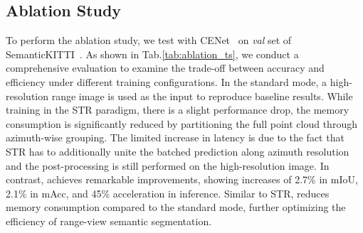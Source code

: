 \subsection{Ablation Study}
To perform the ablation study, we test with CENet~\cite{cheng2022cenet} on \textit{val} set of SemanticKITTI~\cite{behley2019semantickitti}. %
 As shown in Tab.\ref{tab:ablation_ts}, we conduct a comprehensive evaluation to examine the trade-off between accuracy and efficiency under different training configurations. In the standard mode, a high-resolution range image is used as the input to reproduce baseline results. While training in the STR paradigm\cite{kong2023rethinking}, there is a slight performance drop, the memory consumption is significantly reduced by partitioning the full point cloud through azimuth-wise grouping. The limited increase in latency is due to the fact that STR has to additionally unite the batched prediction along azimuth resolution and the post-processing is still performed on the high-resolution image. In contrast, \coolname{} achieves remarkable improvements, showing increases of 2.7\% in mIoU, 2.1\% in mAcc, and 45\% acceleration in inference. Similar to STR, \coolname{} reduces memory consumption compared to the standard mode, further optimizing the efficiency of range-view semantic segmentation. %
\begin{table}[H]
\vspace{-3mm}
\renewcommand \arraystretch{1}
\caption{Performance with varying training schemes is evaluated on \textit{val} set of SemanticKITTI~\cite{behley2019semantickitti}. Input resolution is formatted in $B\times H \times W$ (batch size, image width and height). For STR~\cite{kong2023rethinking}, we use the configuration yielding the best performance on CENet~\cite{cheng2022cenet}: a full resolution of $64\times1920$ split into four $64\times480$ sub-images. For the fair comparison, all models are integrated with proposed components and trained from scratch.}
    \vspace{-4.5mm}
    \label{tab:ablation_ts}
\end{table}

